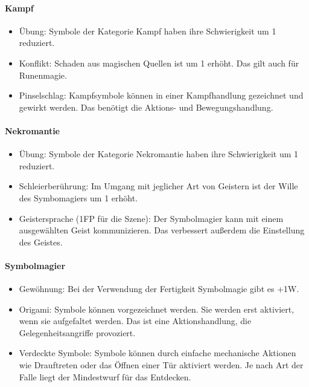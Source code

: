 \documentclass{article}
\begin{document}
\paragraph{Kampf}

\begin{itemize}
\item Übung: Symbole der Kategorie Kampf haben ihre Schwierigkeit um 1 reduziert.
\item Konflikt: Schaden aus magischen Quellen ist um 1 erhöht. Das gilt auch für Runenmagie.
\item Pinselschlag: Kampfsymbole können in einer Kampfhandlung gezeichnet und gewirkt werden. Das benötigt die Aktions- und Bewegungshandlung.
\end{itemize}

\paragraph{Nekromantie}

\begin{itemize}
\item Übung: Symbole der Kategorie Nekromantie haben ihre Schwierigkeit um 1 reduziert.
\item Schleierberührung: Im Umgang mit jeglicher Art von Geistern ist der Wille des Symbomagiers um 1 erhöht.
\item Geistersprache (1FP für die Szene): Der Symbolmagier kann mit einem ausgewählten Geist kommunizieren. Das verbessert außerdem die Einstellung des Geistes.
\end{itemize}

\paragraph{Symbolmagier}

\begin{itemize}
\item Gewöhnung: Bei der Verwendung der Fertigkeit Symbolmagie gibt es +1W.
\item Origami: Symbole können vorgezeichnet werden. Sie werden erst aktiviert, wenn sie aufgefaltet werden. Das ist eine Aktionshandlung, die Gelegenheitsangriffe provoziert.
\item Verdeckte Symbole: Symbole können durch einfache mechanische Aktionen wie Drauftreten oder das Öffnen einer Tür aktiviert werden. Je nach Art der Falle liegt der Mindestwurf für das Entdecken.
\end{itemize}
\end{document}
